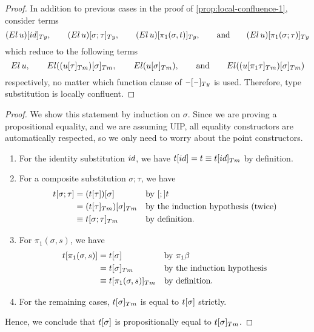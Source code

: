 \documentclass[a4paper,UKenglish,numberwithinsect,cleveref,thm-restate]{lipics-v2021}
\begin{document}
\propConfluenceTwo*
\begin{proof}
  In addition to previous cases in the proof of \cref{prop:local-confluence-1}, consider terms 
  \[
    \subTy{(\El\,u)}{\idS}, \qquad \subTy{(\El\,u)}{\sigma;\tau}, \qquad \subTy{(\El\,u)}{\pi_1(\sigma, t)}, \qquad\text{and}\qquad \subTy{(\El\,u)}{\pi_1(\sigma; \tau)}
  \]
  which reduce to the following terms
  \[
    \El\,u, \qquad \El(\subTm{(\subTm{u}{\tau})}{\sigma}, \qquad \El(\subTm{u}{\sigma}), \qquad\text{and}\qquad
    \El(\subTm{(\subTm{u}{\pi_1\tau})}{\sigma})
  \]
  respectively, no matter which function clause of $\subTy{\blank}{\blank}$ is used.
  Therefore, type substitution is locally confluent.
\end{proof}

\propCorrectness*
\begin{proof}
  We show this statement by induction on $\sigma$. Since we are proving a propositional equality, and we are assuming UIP, all equality constructors are automatically respected, so we only need to worry about the point constructors.
  \begin{enumerate}
    \item For the identity substitution $\idS$, we have $\sub{t}{\idS} = t \judgeq \subTm{t}{\idS}$ by definition.
    \item For a composite substitution $\sigma; \tau$, we have
      \begin{align*}
        \sub{t}{\sigma;\tau} & = \sub{(\sub{t}{\tau})}{\sigma}            && \text{by $[;]t$} \\
                       & = \subTm{(\subTm{t}{\tau})}{\sigma} && \text{by the induction hypothesis (twice)} \\ %
                       & \judgeq \subTm{t}{\sigma;\tau} && \text{by definition.}
      \end{align*}
    \item For $\pi_1(\sigma, s)$, we have
      \begin{align*}
        \sub{t}{\pi_1(\sigma, s)} & = \sub{t}{\sigma}               && \text{by $\pi_1\beta$} \\
                            & = \subTm{t}{\sigma}       && \text{by the induction hypothesis} \\ %
                            & \judgeq \subTm{t}{\pi_1(\sigma, s)} && \text{by definition.}
      \end{align*}
    \item For the remaining cases, $\subTm{t}{\sigma}$ is equal to ${{t}[ \sigma ]}$ strictly.
  \end{enumerate}
  Hence, we conclude that ${{t}[ \sigma ]}$ is propositionally equal to $\subTm{t}{\sigma}$.
\end{proof}
\end{document}
